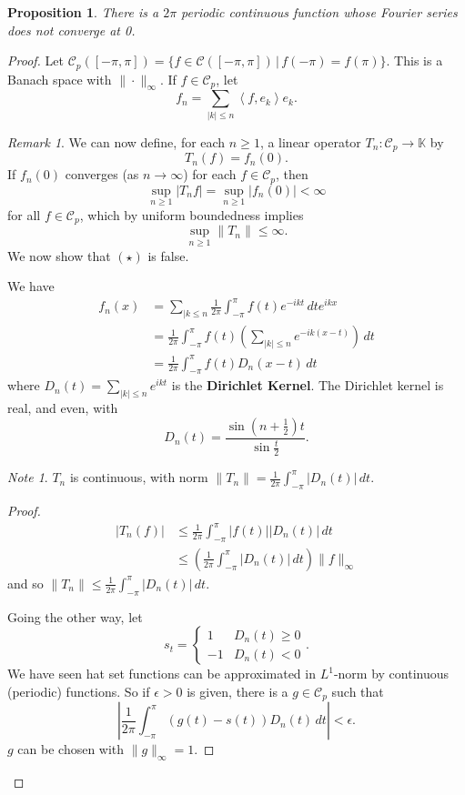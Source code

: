 \documentclass[justified]{tufte-book}
\theoremstyle{plain}%
\newtheorem{prop}[thm]{Proposition}
\theoremstyle{definition}
\theoremstyle{remark}
\newtheorem*{rem}{Remark}
\newtheorem*{note}{Note}
\newcommand{\given}{ \, | \,}
\newcommand{\K}{\mathbb{K}}
\newcommand{\iprod}[1]{\left\langle #1 \right\rangle}
\begin{document}
\begin{prop}
  There is a $2\pi$ periodic continuous function whose Fourier series does not converge at 0.  
\end{prop}
\begin{proof}
  Let $\mathcal{C}_p([-\pi, \pi]) = \{ f \in \mathcal C([-\pi, \pi]) \given f(-\pi) = f(\pi) \}.$  This is a Banach space with $\| \cdot \|_\infty $.  If $f \in \mathcal C_p$, let \[
      f_n = \sum_{|k | \leq n} \iprod{f, e_k} e_k.
  \]

\begin{rem}
  We can now define, for each $n \geq 1$, a linear operator $T_n : \mathcal C_p \rightarrow \K$ by \[
      T_n(f) = f_n(0). 
  \]  If $f_n(0)$ converges (as $ n \rightarrow \infty$) for each $f \in \mathcal C_p$, then \[
      \sup_{n \geq 1} |T_n f | = \sup_{n \geq 1} |f_n(0)| < \infty
  \] for all $f \in \mathcal C_p$, which by uniform boundedness implies \[
      \sup_{n \geq 1} \| T_n \| \leq \infty \tag{$\star$}.
  \]  
  We now show that $(\star)$ is false.
\end{rem}

We have \begin{align*}
  f_n(x)  &= \sum_{| k \leq n} \frac{1}{2 \pi} \int_{-\pi}^\pi f(t) e^{-ikt} \, dt e^{ikx}  \\
          &= \frac{1}{2\pi} \int_{-\pi}^\pi f(t) \left( \sum_{|k| \leq n} e^{-ik(x-t)} \right) \, dt \\
          &= \frac{1}{2 \pi} \int_{-\pi}^\pi f(t) D_n(x-t) \, dt 
\end{align*} where $D_n(t) = \sum_{|k| \leq n} e^{ikt}$ is the \textbf{Dirichlet Kernel}.  The Dirichlet kernel is real, and even, with \[
  D_n(t) = \frac{\sin(n+\frac{1}{2}) t}{\sin \frac{t}{2}}.  
\]  

\begin{note}
  $T_n$ is continuous, with norm $\| T_n \| = \frac{1}{2\pi} \int_{-\pi}^\pi |D_n(t) | \, dt$.
\end{note}

\begin{proof}
  \begin{align*}
      |T_n(f)| &\leq \frac{1}{2\pi} \int_{-\pi}^\pi |f(t)| |D_n(t)| \, dt \\
              &\leq \left( \frac{1}{2\pi} \int_{-\pi}^\pi |D_n(t)| \, dt \right) \| f\|_\infty
  \end{align*} and so $\|T_n \| \leq \frac{1}{2\pi} \int_{-\pi}^\pi |D_n(t)| \, dt$. 
  
  Going the other way, let \[
      s_t = \begin{cases}
      1 &D_n(t) \geq 0 \\
      -1 &D_n(t) < 0
      \end{cases}.
  \]  We have seen hat set functions can be approximated in $L^1$-norm by continuous (periodic) functions.  So if $\epsilon > 0$ is given, there is a $g \in \mathcal C_p$ such that \[
      \left| \frac{1}{2\pi} \int_{-\pi}^\pi (g(t) - s(t))D_n(t) \, dt \right| < \epsilon. 
  \] $g$ can be chosen with $\| g \|_\infty = 1$.  
  

\end{proof}
\end{proof}
\end{document}
